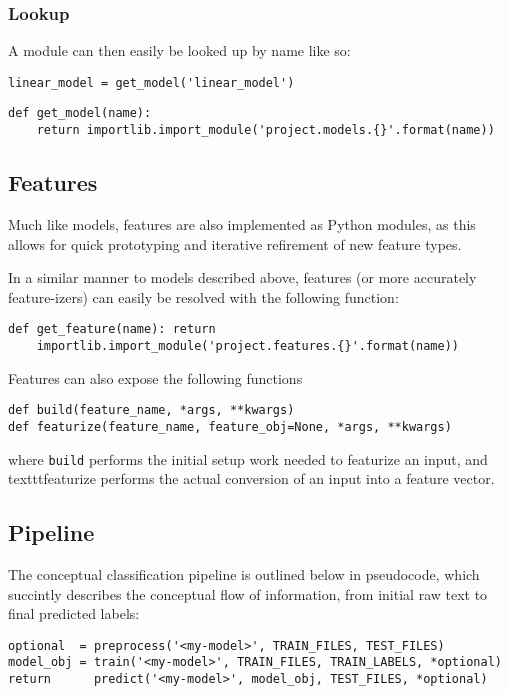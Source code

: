 \documentclass[
10pt, %
a4paper, %
oneside, %
headinclude,footinclude, %
BCOR5mm, %
]{scrartcl}
\begin{document}
\subsubsection{Lookup}
\noindent A module can then easily be looked up by name like so:
\begin{verbatim}
linear_model = get_model('linear_model')
\end{verbatim}

\begin{verbatim}
def get_model(name):
    return importlib.import_module('project.models.{}'.format(name))
\end{verbatim}

\subsection{Features}

\noindent Much like models, features are also implemented as Python modules, as
this allows for quick prototyping and iterative refirement of new feature types.

\noindent In a similar manner to models described above, features (or more
accurately feature-izers) can easily be resolved with the following function:

\begin{verbatim}
def get_feature(name): return
    importlib.import_module('project.features.{}'.format(name))
\end{verbatim}

\noindent Features can also expose the following functions

\begin{verbatim}
def build(feature_name, *args, **kwargs)
def featurize(feature_name, feature_obj=None, *args, **kwargs)
\end{verbatim}

\noindent where \texttt{build} performs the initial setup work needed to
featurize an input, and texttt{featurize} performs the actual conversion of an
input into a feature vector.

\subsection{Pipeline}

The conceptual classification pipeline is outlined below in pseudocode, which
succintly describes the conceptual flow of information, from initial raw text 
to final predicted labels:

\begin{verbatim}
optional  = preprocess('<my-model>', TRAIN_FILES, TEST_FILES)
model_obj = train('<my-model>', TRAIN_FILES, TRAIN_LABELS, *optional)
return      predict('<my-model>', model_obj, TEST_FILES, *optional)
\end{verbatim}

\end{document}
